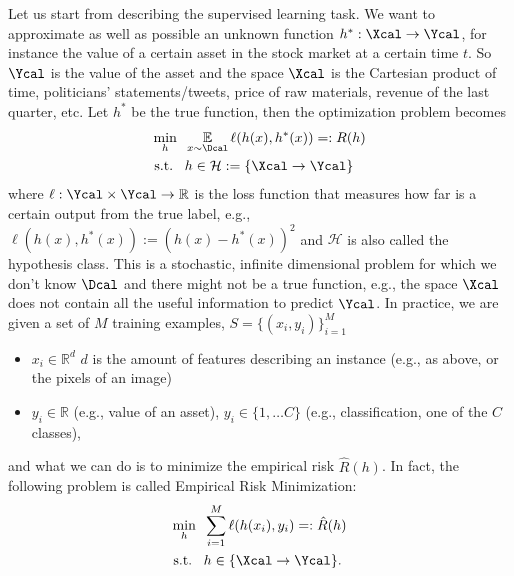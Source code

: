 \documentclass[10pt,a4paper]{article}
\begin{document}
\begin{example} Let us start from describing the supervised learning task. We want to approximate as well as possible an unknown function $h^*:\Xcal\to\Ycal$, for instance the value of a certain asset in the stock market at a certain time $t$. So $\Ycal$ is the value of the asset and the space $\Xcal$ is the Cartesian product of time, politicians' statements/tweets, price of raw materials, revenue of the last quarter, etc. Let $h^*$ be the true function, then the optimization problem becomes
	\begin{equation*}
		\begin{split}
			\min_{h} \;\; &\E_{x\sim \Dcal} \ell(h(x),h^*(x))=:R(h)\\
			\st& h \in \mathcal{H}:=\{\Xcal\to \Ycal\}
		\end{split}
	\end{equation*}
where $\ell:\Ycal\times\Ycal\to \R$ is the loss function that measures how far is a certain output from the true label, e.g., $\ell(h(x),h^*(x)):=(h(x)-h^*(x))^2$ and $\mathcal{H}$ is also called the hypothesis class. This is a stochastic, infinite dimensional problem for which we don't know $\Dcal$ and there might not be a true function, e.g., the space $\Xcal$ does not contain all the useful information to predict $\Ycal$. In practice, we are given a set of $M$ training examples, $S=\{(x_i, y_i)\}_{i=1}^{M}$
\begin{itemize}
	\item $x_i \in \mathbb{R}^{d}$ $d$ is the amount of features describing an instance (e.g., as above, or the pixels of an image)
	\item $y_i\in\mathbb{R}$ (e.g., value of an asset), $y_i\in\{1,\dots C\}$ (e.g., classification, one of the $C$ classes),
\end{itemize}
 and what we can do is to minimize the empirical risk $\hat{R}(h)$. In fact, the following problem is called Empirical Risk Minimization:
\begin{equation*}
	\begin{split}
		\min_{h} \;\; &\sum_{i=1}^M \ell(h(x_i),y_i)=:\hat{R}(h)\\
		\st& h \in \{\Xcal\to \Ycal\}.
	\end{split}
\end{equation*}

\end{example}
\end{document}
